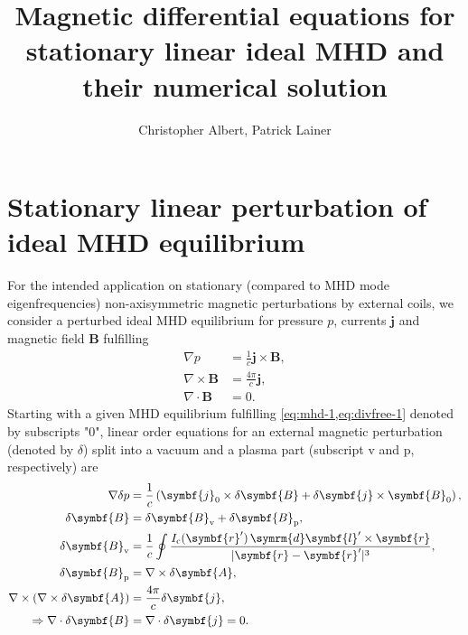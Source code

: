 \documentclass[a4paper, 10pt, english]{article}
\title{Magnetic differential equations for stationary linear ideal MHD and their numerical solution}
\author{Christopher Albert, Patrick Lainer}
\let\vec\symbf
\newcommand*\diff{\ensuremath{\symrm{d}}}  %
\begin{document}
\maketitle
\tableofcontents

\section{Stationary linear perturbation of ideal MHD equilibrium}

For the intended application on stationary (compared to MHD mode eigenfrequencies) non-axisymmetric magnetic perturbations by external coils, we consider a perturbed ideal MHD equilibrium for pressure $p$, currents $\vec{j}$ and magnetic field $\vec{B}$ fulfilling
\begin{align}
  \nabla p &= \frac{1}{c} \vec{j} \times \vec{B}, \label{eq:mhd-1} \\
  \nabla \times \vec{B} &= \frac{4 \pi}{c} \vec{j}, \label{eq:ampere-1} \\
  \nabla \cdot \vec{B} &= 0. \label{eq:divfree-1}
\end{align}
Starting with a given MHD equilibrium fulfilling \cref{eq:mhd-1,eq:divfree-1} denoted by subscripts "$0$", linear order equations for an external magnetic perturbation (denoted by $\delta$) split into a vacuum and a plasma part (subscript $\text{v}$ and $\text{p}$, respectively) are
\begin{align}
  \nabla \delta p &= \frac{1}{c} \left( \vec{j}_{0} \times \delta \vec{B} + \delta \vec{j} \times \vec{B}_{0} \right), \label{eq:mhd} \\
  \delta \vec{B} &= \delta \vec{B}_{\text{v}} + \delta \vec{B}_{\text{p}}, \label{eq:vecpot} \\
  \delta \vec{B}_{\text{v}} &= \frac{1}{c} \oint \frac{I_{\text{c}}(\vec{r}') \, \diff \vec{l}' \times \vec{r}}{\lvert \vec{r} - \vec{r}' \rvert^{3}}, \\
  \delta \vec{B}_{\text{p}} &= \nabla \times \delta \vec{A}, \\
  \nabla \times (\nabla \times \delta \vec{A}) &= \frac{4 \pi}{c} \delta \vec{j}, \label{eq:ampere} \\
  \Rightarrow \nabla \cdot \delta \vec{B} &= \nabla \cdot \delta \vec{j} = 0. \label{eq:divfree}
\end{align}
\end{document}
